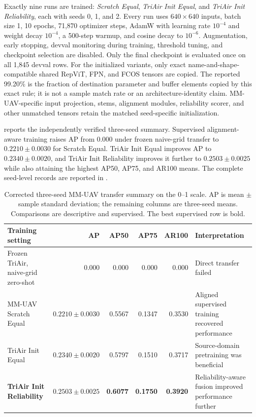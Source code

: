 Exactly nine runs are trained: \textit{Scratch Equal}, \textit{TriAir Init Equal}, and \textit{TriAir Init Reliability}, each with seeds 0, 1, and 2. Every run uses $640\times640$ inputs, batch size 1, 10 epochs, 71,870 optimizer steps, AdamW with learning rate $10^{-4}$ and weight decay $10^{-4}$, a 500-step warmup, and cosine decay to $10^{-6}$. Augmentation, early stopping, devval monitoring during training, threshold tuning, and checkpoint selection are disabled. Only the final checkpoint is evaluated once on all 1,845 devval rows. For the initialized variants, only exact name-and-shape-compatible shared RepViT, FPN, and FCOS tensors are copied. The reported 99.20\% is the fraction of destination parameter and buffer elements copied by this exact rule; it is not a sample match rate or an architecture-identity claim. MM-UAV-specific input projection, stems, alignment modules, reliability scorer, and other unmatched tensors retain the matched seed-specific initialization.

 reports the independently verified three-seed summary. Supervised alignment-aware training raises AP from 0.000 under frozen naive-grid transfer to $0.2210\pm0.0030$ for Scratch Equal. TriAir Init Equal improves AP to $0.2340\pm0.0020$, and TriAir Init Reliability improves it further to $0.2503\pm0.0025$ while also attaining the highest AP50, AP75, and AR100 means. The complete seed-level records are reported in .

\begin{table}[t]
\centering
\caption{Corrected three-seed MM-UAV transfer summary on the 0--1 scale. AP is mean $\pm$ sample standard deviation; the remaining columns are three-seed means. Comparisons are descriptive and supervised. The best supervised row is bold.}
\label{tab:mmuav-transfer}
\scriptsize
\begin{tabularx}{\textwidth}{@{}YrrrrY@{}}
\toprule
Training setting & AP & AP50 & AP75 & AR100 & Interpretation\\
\midrule
Frozen TriAir, naive-grid zero-shot & 0.000 & 0.000 & 0.000 & 0.000 & Direct transfer failed\\
MM-UAV Scratch Equal & $0.2210\pm0.0030$ & 0.5567 & 0.1347 & 0.3530 & Aligned supervised training recovered performance\\
TriAir Init Equal & $0.2340\pm0.0020$ & 0.5797 & 0.1510 & 0.3717 & Source-domain pretraining was beneficial\\
\textbf{TriAir Init Reliability} & $\mathbf{0.2503\pm0.0025}$ & \textbf{0.6077} & \textbf{0.1750} & \textbf{0.3920} & Reliability-aware fusion improved performance further\\
\bottomrule
\end{tabularx}
\end{table}


